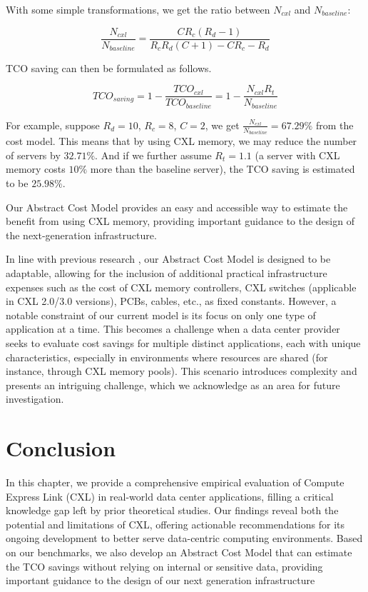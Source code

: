 With some simple transformations, we get the ratio between $N_{cxl}$ and $N_{baseline}$: 

$$ \frac{N_{cxl}}{N_{baseline}} = \frac{CR_c(R_d - 1)}{R_cR_d(C+1) - C R_c - R_d} $$

TCO saving can then be formulated as follows.

$$
TCO_{saving}=1-\frac{TCO_{cxl}}{TCO_{baseline}}=1-\frac{N_{cxl} R_t}{N_{baseline}}
$$


For example, suppose $ R_d = 10 $, $R_c = 8 $, $ C = 2 $, we get $\frac{N_{cxl}}{N_{baseline}} = 67.29\%$ from the cost model.
This means that by using CXL memory, we may reduce the number of servers by $32.71\%$.
And if we further assume $R_t=1.1$ (a server with CXL memory costs $10\%$ more than the baseline server), the TCO saving is estimated to be $25.98\%$.

Our Abstract Cost Model provides an easy and accessible way to estimate the benefit from using CXL memory,
providing important guidance to the design of the next-generation infrastructure.

In line with previous research \cite{CXLPoolCost}, our Abstract Cost Model is designed to be adaptable, allowing for the inclusion of additional practical infrastructure expenses such as the cost of CXL memory controllers, CXL switches (applicable in CXL 2.0/3.0 versions), PCBs, cables, etc., as fixed constants. However, a notable constraint of our current model is its focus on only one type of application at a time. This becomes a challenge when a data center provider seeks to evaluate cost savings for multiple distinct applications, each with unique characteristics, especially in environments where resources are shared (for instance, through CXL memory pools). This scenario introduces complexity and presents an intriguing challenge, which we acknowledge as an area for future investigation.


\section{Conclusion}

In this chapter, we provide a comprehensive empirical evaluation of Compute Express Link (CXL) in real-world data center applications, filling a critical knowledge gap left by prior theoretical studies. Our findings reveal both the potential and limitations of CXL, offering actionable recommendations for its ongoing development to better serve data-centric computing environments. Based on our benchmarks, we also develop an Abstract Cost Model that can estimate the TCO savings without relying on internal or sensitive data, providing important guidance to the design of our next generation infrastructure
